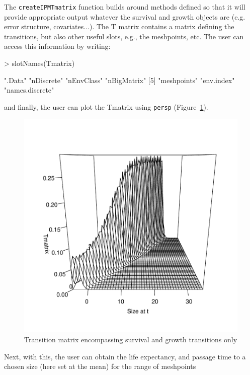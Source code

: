 \documentclass{article}
\begin{document}
The {\tt createIPMTmatrix} function builds around methods defined so that it will provide appropriate output whatever the survival and growth objects are (e.g. error structure, covariates...). The T matrix contains a matrix defining the transitions, but also other useful slots, e.g., the meshpoints, etc. The user can access this information by writing: 
\begin{Schunk}
\begin{Sinput}
> slotNames(Tmatrix)
\end{Sinput}
\begin{Soutput}
[1] ".Data"          "nDiscrete"      "nEnvClass"      "nBigMatrix"    
[5] "meshpoints"     "env.index"      "names.discrete"
\end{Soutput}
\end{Schunk}
and finally, the user can plot the Tmatrix using {\tt persp} (Figure~\ref{fig:two}). 
\begin{figure}
\begin{center}
\includegraphics{IPMpack_Vignette-fig2}
\end{center}
\caption{Transition matrix encompassing survival and growth transitions only}
\label{fig:two}
\end{figure}
Next, with this, the user can obtain the life expectancy, and passage time to a chosen size (here set at the mean) for the range of meshpoints
\end{document}
